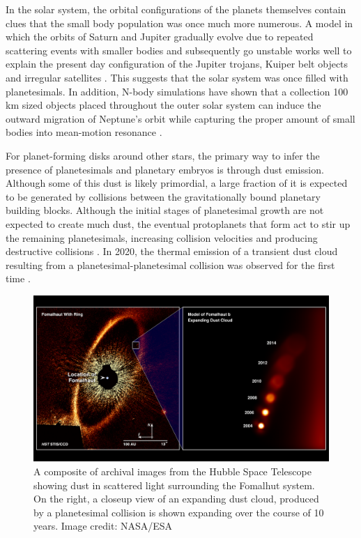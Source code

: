 In the solar system, the orbital configurations of the planets themselves contain clues that the small body population was once much more numerous. A model in which the orbits of Saturn and Jupiter gradually evolve due to repeated scattering events with smaller bodies and subsequently go unstable works well to explain the present day configuration of the Jupiter trojans, Kuiper belt objects and irregular satellites \cite{gomes05, tsiganis05, morbidelli05,}. This suggests that the solar system was once filled with planetesimals. In addition, N-body simulations have shown that a collection 100 km sized objects placed throughout the outer solar system can induce the outward migration of Neptune's orbit while capturing the proper amount of small bodies into mean-motion resonance \cite{murrayclay06}.

For planet-forming disks around other stars, the primary way to infer the presence of planetesimals and planetary embryos is through dust emission. Although some of this dust is likely primordial, a large fraction of it is expected to be generated by collisions between the gravitationally bound planetary building blocks. Although the initial stages of planetesimal growth are not expected to create much dust, the eventual protoplanets that form act to stir up the remaining planetesimals, increasing collision velocities and producing destructive collisions \cite{kenyon04}. In 2020, the thermal emission of a transient dust cloud resulting from a planetesimal-planetesimal collision was observed for the first time \cite{gaspar20}.

\begin{figure}
\begin{center}
    \includegraphics[width=\textwidth]{figures/intro/fomalhutb.png}
    \caption{A composite of archival images from the Hubble Space Telescope showing dust in scattered light surrounding the Fomalhut system. On the right, a closeup view of an expanding dust cloud, produced by a planetesimal collision is shown expanding over the course of 10 years. Image credit: NASA/ESA\label{fig:fomalhutb}}
\end{center}
\end{figure}

